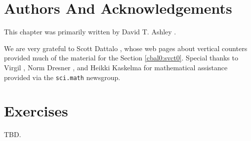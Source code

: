 \section{Authors And Acknowledgements}
This chapter was primarily written by David T. Ashley
\cite{bibref:i:daveashley}.

We are very grateful to Scott Dattalo 
\cite{bibref:i:scottdattalo},
whose web pages about vertical counters provided much of the
material for the Section \ref{cbal0:svct0}.
Special thanks to Virgil \cite{bibref:i:virgil},
Norm Dresner \cite{bibref:i:normdresner},
and Heikki Kaskelma \cite{bibref:i:heikkikaskelma}
for mathematical assistance provided via the 
%
\texttt{sci.math} \cite{bibref:n:scimathnewsgroup} newsgroup.


\section{Exercises}

TBD.


